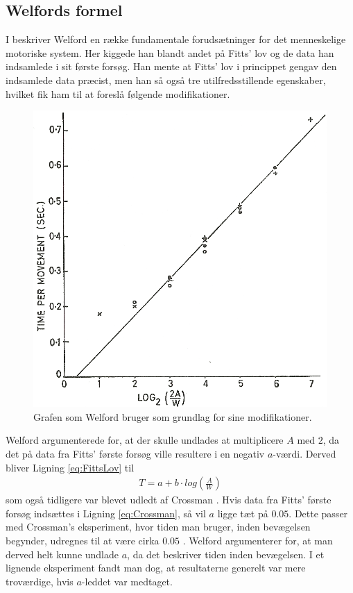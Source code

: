 \subsection*{Welfords formel}

I \cite{welford1968} beskriver Welford en række fundamentale forudsætninger for det menneskelige motoriske system. Her kiggede han blandt andet på Fitts' lov og de data han indsamlede i sit første forsøg. Han mente at Fitts' lov i princippet gengav den indsamlede data præcist, men han så også tre utilfredsstillende egenskaber, hvilket fik ham til at foreslå følgende modifikationer.
\begin{figure}[h]
\centering
\includegraphics[width=.5\textwidth]{images/illustrations/welford_plot_1}
\caption{Grafen som Welford bruger som grundlag for sine modifikationer.}
\label{fig:WelfordGraf}
\end{figure}
Welford argumenterede for, at der skulle undlades at multiplicere $A$ med $2$, da det på data fra Fitts' første forsøg ville resultere i en negativ $a$-værdi. Derved bliver Ligning \ref{eq:FittsLov} til
\begin{align}
\label{eq:Crossman}
T = a + b \cdot log\left(\frac{A}{W}\right)
\end{align}
som også tidligere var blevet udledt af Crossman \cite{crossman1957}. Hvis data fra Fitts' første forsøg indsættes i Ligning \ref{eq:Crossman}, så vil $a$ ligge tæt på $0.05$. Dette passer med Crossman's eksperiment, hvor tiden man bruger, inden bevægelsen begynder, udregnes til at være cirka $0.05$ \cite{crossman1957}. Welford argumenterer for, at man derved helt kunne undlade $a$, da det beskriver tiden inden bevægelsen. I et lignende eksperiment \cite{welford1958} fandt man dog, at resultaterne generelt var mere troværdige, hvis $a$-leddet var medtaget.

